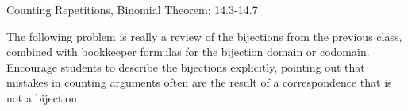 \documentclass[handout]{mcs}
\begin{document}

\begin{staffnotes}
Counting Repetitions, Binomial Theorem: 14.3-14.7
\end{staffnotes}



\begin{staffnotes}
The following problem is really a review of the bijections from the
previous class, combined with bookkeeper formulas for the bijection
domain or codomain.  Encourage students to describe the bijections
explicitly, pointing out that mistakes in counting arguments often are
the result of a correspondence that is not a bijection.
\end{staffnotes}


\end{document}
